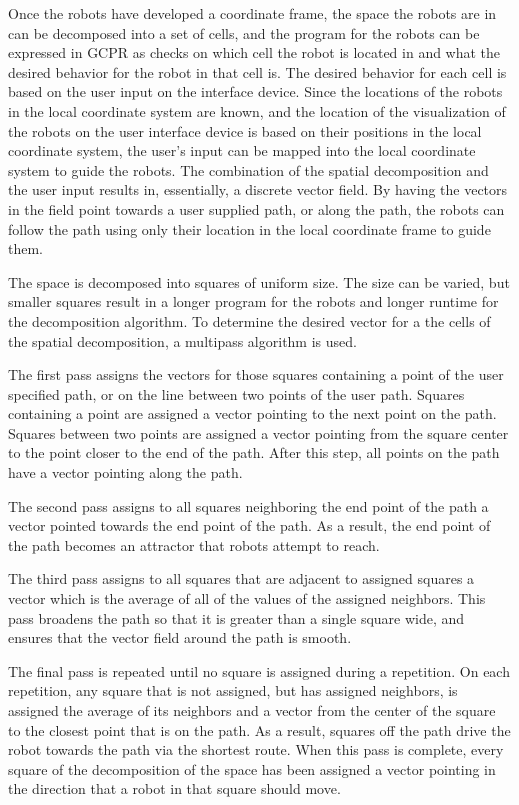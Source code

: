 Once the robots have developed a coordinate frame, the space the robots are in can be decomposed into a set of cells, and the program for the robots can be expressed in GCPR as checks on which cell the robot is located in and what the desired behavior for the robot in that cell is. 
The desired behavior for each cell is based on the user input on the interface device. Since the locations of the robots in the local coordinate system are known, and the location of the visualization of the robots on the user interface device is based on their positions in the local coordinate system, the user's input can be mapped into the local coordinate system to guide the robots. 
The combination of the spatial decomposition and the user input results in, essentially, a discrete vector field. 
By having the vectors in the field point towards a user supplied path, or along the path, the robots can follow the path using only their location in the local coordinate frame to guide them. 

The space is decomposed into squares of uniform size. The size can be varied, but smaller squares result in a longer program for the robots and longer runtime for the decomposition algorithm. 
To determine the desired vector for a the cells of the spatial decomposition, a multipass algorithm is used. 

The first pass assigns the vectors for those squares containing a point of the user specified path, or on the line between two points of the user path. 
Squares containing a point are assigned a vector pointing to the next point on the path. 
Squares between two points are assigned a vector pointing from the square center to the point closer to the end of the path. 
After this step, all points on the path have a vector pointing along the path. 

The second pass assigns to all squares neighboring the end point of the path a vector pointed towards the end point of the path. 
As a result, the end point of the path becomes an attractor that robots attempt to reach. 

The third pass assigns to all squares that are adjacent to assigned squares a vector which is the average of all of the values of the assigned neighbors. 
This pass broadens the path so that it is greater than a single square wide, and ensures that the vector field around the path is smooth. 

The final pass is repeated until no square is assigned during a repetition. 
On each repetition, any square that is not assigned, but has assigned neighbors, is assigned the average of its neighbors and a vector from the center of the square to the closest point that is on the path. 
As a result, squares off the path drive the robot towards the path via the shortest route. 
When this pass is complete, every square of the decomposition of the space has been assigned a vector pointing in the direction that a robot in that square should move. 

